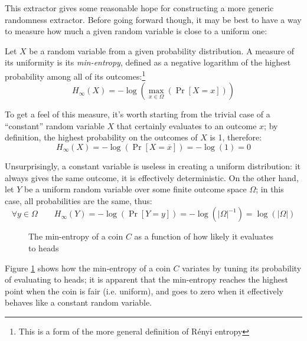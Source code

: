 This extractor gives some reasonable hope for constructing a more generic randomness extractor. Before going forward though, it may be best to have a way to measure how much a given random variable is close to a uniform one:

\begin{definition}
    Let $X$ be a random variable from a given probability distribution. A measure of its uniformity is its \emph{min-entropy}, defined as a negative logarithm of the highest probability among all of its outcomes:\footnote{This is a form of the more general definition of R\'enyi entropy}
    \[
        H_{\infty}(X) = -\log(\max_{x \in \Omega}(\Pr[X = x]))
    \]
\end{definition}

To get a feel of this measure, it's worth starting from the trivial case of a ``constant'' random variable $X$ that certainly evaluates to an outcome $x$; by definition, the highest probability on the outcomes of $X$ is 1, therefore: 
\[
    H_{\infty}(X) = -\log(\Pr[X = \overline{x}]) = -\log(1) = 0
\]

Unsurprisingly, a constant variable is useless in creating a uniform distribution: it always gives the same outcome, it is effectively deterministic. On the other hand, let $Y$ be a uniform random variable over some finite outcome space $\Omega$; in this case, all probabilities are the same, thus:
\[
    \forall y \in \Omega \qquad H_{\infty}(Y) = -\log(\Pr[Y = y]) = -\log(|\Omega|^{-1}) = \log(|\Omega|)
\]

\begin{figure}
    \centering
    \caption{The min-entropy of a coin $C$ as a function of how likely it evaluates to heads}
    \label{fig:coinminentropy}
\end{figure}

Figure \ref{fig:coinminentropy} shows how the min-entropy of a coin $C$ variates by tuning its probability of evaluating to heads; it is apparent that the min-entropy reaches the highest point when the coin is fair (i.e. uniform), and goes to zero when it effectively behaves like a constant random variable.

